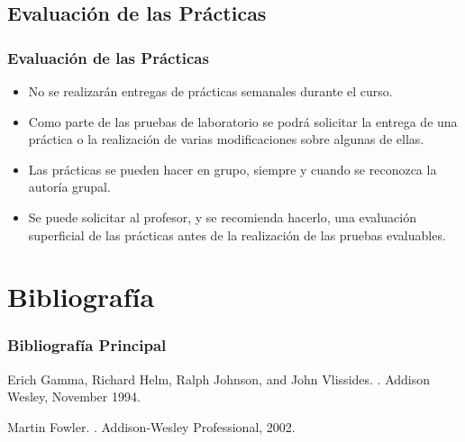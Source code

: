 \documentclass[animated,a4paper,slidestop,xcolor=pst,blue]{beamer}
\begin{document}
\subsection{Evaluación de las Prácticas}

\begin{frame}[c]
    \frametitle{Evaluación de las Prácticas}
	\begin{itemize}[<+->]
        \item<1-> No se realizarán entregas de prácticas semanales durante el curso.
        \item<2-> Como parte de las pruebas de laboratorio se podrá solicitar la entrega de una práctica o la realización de varias modificaciones sobre algunas de ellas.
        \item<3-> Las prácticas se pueden hacer en grupo, siempre y cuando se reconozca la autoría grupal.
        \item<4-> Se puede solicitar al profesor, y se recomienda hacerlo, una evaluación superficial de las prácticas antes de la realización de las pruebas evaluables.
    \end{itemize}
\end{frame}

\section{Bibliografía}

\begin{frame}[c]
	\frametitle{Bibliografía Principal}
    \begin{thebibliography}{1}

Erich Gamma, Richard Helm, Ralph Johnson, and John Vlissides.
.
\newblock Addison Wesley, November 1994.

Martin Fowler.
.
\newblock Addison-Wesley Professional, 2002.

\end{thebibliography}
\end{frame}
\end{document}

